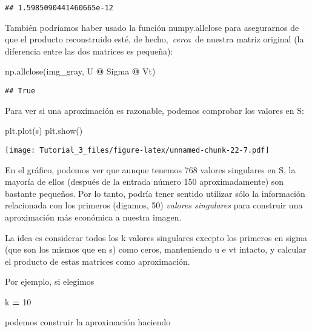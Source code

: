 \documentclass[
]{article}
\newenvironment{Shaded}{\begin{snugshade}}{\end{snugshade}}
\newcommand{\DecValTok}[1]{\textcolor[rgb]{0.00,0.00,0.81}{#1}}
\newcommand{\NormalTok}[1]{#1}
\newcommand{\OperatorTok}[1]{\textcolor[rgb]{0.81,0.36,0.00}{\textbf{#1}}}
\begin{document}
\begin{verbatim}
## 1.5985090441460665e-12
\end{verbatim}

También podríamos haber usado la función numpy.allclose para asegurarnos
de que el producto reconstruido esté, de hecho,~\emph{cerca}~de nuestra
matriz original (la diferencia entre las dos matrices es pequeña):

\begin{Shaded}
\begin{Highlighting}[]
\NormalTok{np.allclose(img\_gray, U }\OperatorTok{@}\NormalTok{ Sigma }\OperatorTok{@}\NormalTok{ Vt)}
\end{Highlighting}
\end{Shaded}

\begin{verbatim}
## True
\end{verbatim}

Para ver si una aproximación es razonable, podemos comprobar los valores
en S:

\begin{Shaded}
\begin{Highlighting}[]
\NormalTok{plt.plot(s)}
\NormalTok{plt.show()}
\end{Highlighting}
\end{Shaded}

\texttt{[image: Tutorial\_3\_files/figure-latex/unnamed-chunk-22-7.pdf]}

En el gráfico, podemos ver que aunque tenemos 768 valores singulares en
S, la mayoría de ellos (después de la entrada número 150
aproximadamente) son bastante pequeños. Por lo tanto, podría tener
sentido utilizar sólo la información relacionada con los primeros
(digamos, 50) \emph{valores singulares} para construir una aproximación
más económica a nuestra imagen.

La idea es considerar todos los k valores singulares excepto los
primeros en sigma (que son los mismos que en s) como ceros, manteniendo
u e vt intacto, y calcular el producto de estas matrices como
aproximación.

Por ejemplo, si elegimos

\begin{Shaded}
\begin{Highlighting}[]
\NormalTok{k }\OperatorTok{=} \DecValTok{10}
\end{Highlighting}
\end{Shaded}

podemos construir la aproximación haciendo
\end{document}
